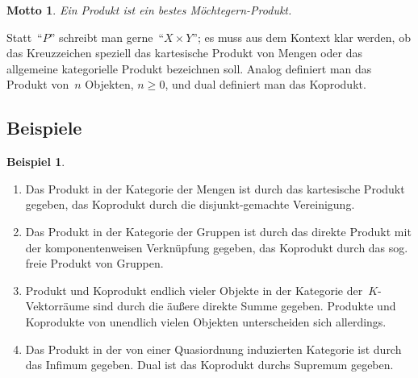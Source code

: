 \documentclass[a4paper,ngerman]{scrartcl}
\theoremstyle{definition}
\newtheorem{bsp}[defn]{Beispiel}
\theoremstyle{plain}
\newtheorem{motto}[defn]{Motto}
\theoremstyle{remark}
\begin{document}
\begin{motto}Ein Produkt ist ein bestes Möchtegern-Produkt.\end{motto}

Statt~"`$P$"' schreibt man gerne~"`$X \times Y$"'; es muss aus dem Kontext klar
werden, ob das Kreuzzeichen speziell das kartesische Produkt von Mengen
oder das allgemeine kategorielle Produkt bezeichnen soll.
Analog definiert man das Produkt von~$n$ Objekten, $n \geq 0$, und dual
definiert man das Koprodukt.


\subsection{Beispiele}

\begin{bsp}\begin{enumerate}
\item Das Produkt in der Kategorie der Mengen ist durch das kartesische Produkt
gegeben, das Koprodukt durch die disjunkt-gemachte Vereinigung.
\item Das Produkt in der Kategorie der Gruppen ist durch das direkte Produkt
mit der komponentenweisen Verknüpfung gegeben, das Koprodukt durch das sog.
freie Produkt von Gruppen.
\item Produkt und Koprodukt endlich vieler Objekte in der Kategorie
der~$K$-Vektorräume sind durch die äußere direkte Summe gegeben. Produkte und
Koprodukte von unendlich vielen Objekten unterscheiden sich allerdings.
\item Das Produkt in der von einer Quasiordnung induzierten Kategorie ist durch
das Infimum gegeben. Dual ist das Koprodukt
durchs Supremum gegeben.
\end{enumerate}\end{bsp}
\end{document}
